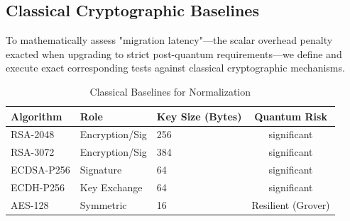 \begin{table}[htbp]
\caption{PQC Application Scope (NIST Standards and Candidates)}
\label{tab:algorithms}
\centering
{}
\end{table}

\subsection{Classical Cryptographic Baselines}

To mathematically assess "migration latency"—the scalar overhead penalty exacted when upgrading to strict post-quantum requirements—we define and execute exact corresponding tests against classical cryptographic mechanisms.

\begin{table}[htbp]
\caption{Classical Baselines for Normalization}
\label{tab:classical}
\centering
\begin{tabular}{lllc}
\toprule
\textbf{Algorithm} & \textbf{Role} & \textbf{Key Size (Bytes)} & \textbf{Quantum Risk} \\
\midrule
RSA-2048 & Encryption/Sig & 256 & significant \\
RSA-3072 & Encryption/Sig & 384 & significant \\
ECDSA-P256 & Signature & 64 & significant \\
ECDH-P256 & Key Exchange & 64 & significant \\
AES-128 & Symmetric & 16 & Resilient (Grover) \\
\bottomrule
\end{tabular}
\end{table}

